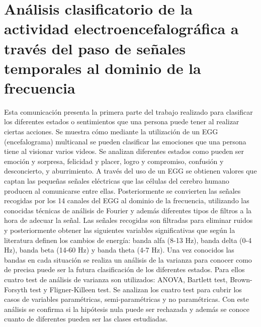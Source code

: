 \chapter{Análisis clasificatorio de la actividad electroencefalográfica a través del paso de señales temporales al dominio de la frecuencia}




Esta comunicación presenta la primera parte del trabajo realizado para clasificar los diferentes estados o sentimientos que una persona puede tener al realizar ciertas acciones. Se muestra cómo mediante la utilización de un EGG (encefalograma) multicanal se pueden clasificar las emociones que una persona tiene al visionar varios videos. Se analizan diferentes estados como pueden ser emoción y sorpresa, felicidad y placer, logro y compromiso, confusión y desconcierto, y aburrimiento. A través del uso de un EGG se obtienen valores que captan las pequeñas señales eléctricas que las células del cerebro humano producen al comunicarse entre ellas. Posteriormente se convierten las señales recogidas por los 14 canales del EGG al dominio de la frecuencia, utilizando las conocidas técnicas de análisis de Fourier y además diferentes tipos de filtros a la hora de adecuar la señal. Las señales recogidas son filtradas para eliminar ruidos y posteriormente obtener las siguientes variables significativas que según la literatura definen los cambios de energía: banda alfa (8-13 Hz), banda delta (0-4 Hz), banda beta (14-60 Hz) y banda theta (4-7 Hz). Una vez conocidos las bandas en cada situación se realiza un análisis de la varianza para conocer como de precisa puede ser la futura clasificación de los diferentes estados. Para ellos cuatro test de análisis de varianza son utilizados: ANOVA, Bartlett test, Brown-Forsyth test y Fligner-Killeen test. Se analizan los cuatro test para cubrir los casos de variables paramétricas, semi-paramétricas y no paramétricas. Con este análisis se confirma si la hipótesis nula puede ser rechazada y además se conoce cuanto de diferentes pueden ser las clases estudiadas.

%

%
